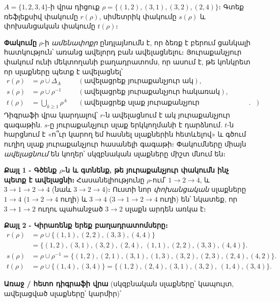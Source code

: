 \documentclass[11pt,a4paper]{article}
\begin{document}
\begin{problembox}[7.2]
$A=\{1,2,3,4\}$-ի վրա դիցուք $\rho=\{(1,2),(3,1),(3,2),(2,4)\}$։ Գտեք ռեֆլեքսիվ փակումը $r(\rho)$,
սիմետրիկ փակումը $s(\rho)$ և փոխանցական փակումը $t(\rho)$։
\end{problembox}

\begin{ideabox}
\textbf{Փակումը} $\rho$-ի \emph{ամենափոքր} ընդլայնումն է, որ ձեռք է բերում ցանկալի հատկություն՝ առանց
ավելորդ բան ավելացնելու։ Յուրաքանչյուր փակում ունի մեկտողանի բաղադրատոմս, որ ասում է, թե կոնկրետ որ
սլաքները պետք է ավելացնել՝
\begin{align*}
r(\rho)&=\rho\cup\Delta_A && (\text{ավելացրեք յուրաքանչյուր ակ}),\\
s(\rho)&=\rho\cup\rho^{-1} && (\text{ավելացրեք յուրաքանչյուր հակառակ}),\\
t(\rho)&=\bigcup_{k\ge1}\rho^{\,k} && (\text{ավելացրեք սլաք յուրաքանչյուր կողմնորոշված ուղու համար}).
\end{align*}
Դիգրաֆի վրա կարդալով՝ $r$-ն ավելացնում է ակ յուրաքանչյուր գագաթին. $s$-ը յուրաքանչյուր սլաք երկկողմանի է
դարձնում. $t$-ն հարցնում է «ո՞ւր կարող եմ հասնել սլաքներին հետևելով» և գծում ուղիղ սլաք յուրաքանչյուր
հասանելի գագաթի։ Փակումները միայն \emph{ավելացնում} են կողեր՝ սկզբնական սլաքները միշտ մնում են։
\end{ideabox}

\textbf{Քայլ 1 - Գծենք $\rho$-ն և գտնենք, թե յուրաքանչյուր փակումն ինչ պետք է ավելացնի։}
Հասանելիությունը $\rho$-ում՝ $1\to2\to4$, և $3\to1\to2\to4$ (նաև $3\to2\to4$)։ Ուստի նոր
\emph{փոխանցական} սլաքները $1\to4$ ($1\to2\to4$ ուղի) և $3\to4$ ($3\to1\to2\to4$ ուղի) են՝ նկատեք,
որ $3\to1\to2$ ուղու պահանջած $3\to2$ սլաքն արդեն առկա է։

\textbf{Քայլ 2 - Կիրառենք երեք բաղադրատոմսերը։}
\begin{align*}
r(\rho)&=\rho\cup\{(1,1),(2,2),(3,3),(4,4)\}\\
&=\{(1,2),(3,1),(3,2),(2,4),\ (1,1),(2,2),(3,3),(4,4)\}.\\[3pt]
s(\rho)&=\rho\cup\rho^{-1}
=\{(1,2),(2,1),(3,1),(1,3),(3,2),(2,3),(2,4),(4,2)\}.\\[3pt]
t(\rho)&=\rho\cup\{(1,4),(3,4)\}
=\{(1,2),(2,4),(3,1),(3,2),\ (1,4),(3,4)\}.
\end{align*}

\textbf{Առաջ / հետո դիգրաֆի վրա} (սկզբնական սլաքները՝ կապույտ, \textcolor{armRed}{ավելացված սլաքները՝
կարմիր})՝
\end{document}
